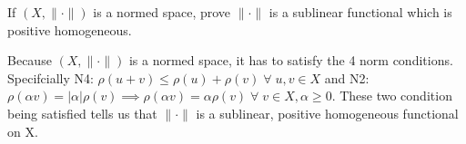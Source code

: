 \documentclass[11pt]{SelfArxOneColBMN}
\begin{document}
\begin{exercise}
    If $(X,\|\cdot\|)$ is a normed space, prove $\|\cdot\|$ is a sublinear functional which is positive homogeneous.
    \begin{solution}
        Because $(X,\|\cdot\|)$ is a normed space, it has to satisfy the 4 norm conditions. Specifcially N4: $\rho(u + v) \leq \rho(u) + \rho(v) \; \forall \; u,v \in X$ and N2: $\rho(\alpha v) = |\alpha|\rho(v) \implies \rho(\alpha v) = \alpha\rho(v) \; \forall \; v \in X, \alpha \geq 0$. These two condition being satisfied tells us that $\|\cdot\|$ is a sublinear, positive homogeneous functional on X.
    \end{solution}
\end{exercise}
\end{document}
